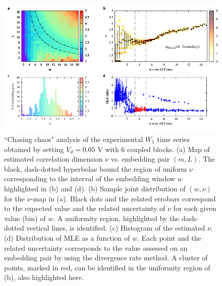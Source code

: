 \begin{figure}[H]
    \centering
    \includegraphics[width=\linewidth]{../blocks/6_blocks/2e5_points/plots/chaos_low.pdf}
    \caption{``Chasing chaos" analysis of the experimental $W_1$ time series obtained by setting $V_d=0.05$ V with 6 coupled blocks.
    (a) Map of estimated correlation dimension $\nu$ vs. embedding pair $(m, L)$.
    The black, dash-dotted hyperbolae bound the region of uniform $\nu$ corresponding to the interval of the
    embedding window $w$ highlighted in (b) and (d).
    (b) Sample joint distribution of $(w,\nu)$ for the $\nu$-map in (a).
    Black dots and the related errobars correspond to the expected value and the related uncertainty of $\nu$
    for each given value (bin) of $w$. A uniformity region, highlighted by the dash-dotted vertical lines,
    is identified. (c) Histogram of the estimated $\nu$. (d) Distribution of MLE as a function of $w$. Each point and the related
    uncertainty corresponds to the value assessed on an embedding pair by using the divergence rate method.
    A cluster of points, marked in red, can be identified in the uniformity region of (b), also highlighted here.}
    \label{fig:6 blocks chaos}
\end{figure}


